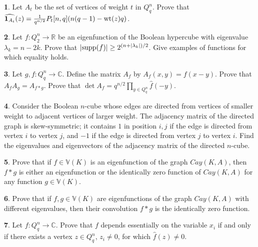 \documentclass[11pt]{article}
\theoremstyle{definition}
\newtheorem{exercise}{\quad}
\newcommand{\wt}{{\rm wt}}
\begin{document}
{{{\begin{exercise}\label{exer1}
Let $A_t$ be the set of vertices of weight $t$ in $Q^n_q$. Prove that
$\widehat{{\mathbf 1}_{A_t}}(z)=\frac{1}{q^{n/2}}P_t[n,q](n(q-1)-\wt(z)q)$.
\end{exercise}

\begin{exercise}\label{exer76}
Let $f:Q^n_2\rightarrow \mathbb{R}$ be an eigenfunction of the Boolean hypercube with eigenvalue $\lambda_k=n-2k$. Prove that
$|{\rm supp}({f})|\geq 2^{(n+|\lambda_k|)/2}$. Give examples of functions for which equality holds.
\end{exercise}

\begin{exercise}
Let $g,f:Q_q^n\rightarrow \mathbb{C}$. Define the matrix $A_f$ by $A_f(x,y)=f(x-y)$. Prove that $A_fA_g=A_{f*g}$. Prove that $\det A_f= q^{n/2}\prod\limits_{y\in Q_q^n}\widehat{f}(-y)$.
\end{exercise}

\begin{exercise}
Consider the Boolean $n$-cube 
whose edges are directed from vertices of smaller weight to adjacent vertices of larger weight.
The adjacency matrix of the directed graph is skew-symmetric; it contains $1$ in position $i,j$ if the edge is directed from vertex $i$ to vertex $j$, and $-1$ if the edge is directed from vertex $j$ to vertex $i$. Find the eigenvalues and eigenvectors of the adjacency matrix of the directed $n$-cube.
\end{exercise}

\begin{exercise}
Prove that if $f\in \mathbb{V}(K)$ is an eigenfunction of the graph $Cay(K,A)$, then $f*g$
is either an eigenfunction or the identically zero function of $Cay(K,A)$ for any function $g\in \mathbb{V}(K)$.
\end{exercise}

\begin{exercise}
Prove that if $f,g\in \mathbb{V}(K)$ are eigenfunctions of the graph $Cay(K,A)$ with different eigenvalues, then their convolution $f*g$ is the identically zero function.
\end{exercise}

\begin{exercise}\label{exer:Ess}
Let $f: Q^n_q\rightarrow \mathbb{C}$. Prove that $f$ depends essentially on the variable $x_i$ if and only if there exists a vertex $z\in Q^n_q$, $z_i\neq 0$, for which $\widehat{f}(z)\neq 0$.
\end{exercise}

}}}
\end{document}

